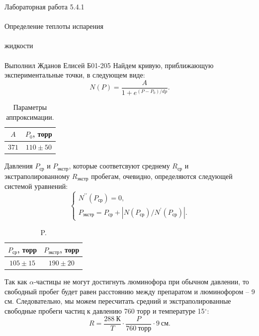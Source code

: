 \documentclass{astroedu-lab}
\begin{document}
\begin{problem}{\huge Лабораторная работа 5.4.1\\\\Определение теплоты испарения\\\\жидкости\\\\Выполнил Жданов Елисей Б01-205}
		Найдем кривую, приближающую экспериментальные точки, в следующем виде:
		\begin{equation*}
			N (P) = \frac{A}{1+e^{(P-P_0)/dp}}.
		\end{equation*}
		
		\begin{table}[H]
			\caption{Параметры аппроксимации.}
			\label{tab:parametry2}
			\centering
			\begin{tabular}{|c|c|}
				\hline
				$A$ & $P_0$, торр \\ \hline
				$371$  & $110 \pm 50$      \\ \hline
			\end{tabular}
		\end{table}
		
		Давления $P_\text{ср}$ и $P_\text{экстр}$, которые соответсвуют среднему $R_\text{ср}$ и экстраполированному $R_\text{экстр}$ пробегам, очевидно, определяются следующей системой уравнений:
		\begin{equation*}
			\begin{cases}
				N^{\prime \prime} (P_\text{ср}) = 0, \\
				P_\text{экстр} = P_\text{ср} + \left|N(P_\text{ср})/N^\prime(P_\text{ср})\right|.
			\end{cases}
		\end{equation*}
	
		\begin{table}[H]
			\caption{P.}
			\label{tab:P}
			\centering
			\begin{tabular}{|c|c|}
				\hline
				$P_\text{ср}$, торр & $P_\text{экстр}$, торр \\ \hline
				$105 \pm 15 $   & $190 \pm 20$       \\ \hline
			\end{tabular}
		\end{table}
	
		\newpage
		Так как $\alpha$-частицы не могут достигнуть люминофора при обычном давлении, то свободный пробег будет равен расстоянию между препаратом и люминофором -- 9 см. Следовательно, мы можем пересчитать средний и экстраполированные свободные пробеги частиц к давлению 760 торр и температуре 15$^\circ$:
		\begin{equation*}
			R = \frac{288 \ \text{К}}{T} \cdot \frac{P}{760 \ \text{торр}} \cdot 9 \ \text{см}.
		\end{equation*}
		

\end{problem}
\end{document}
